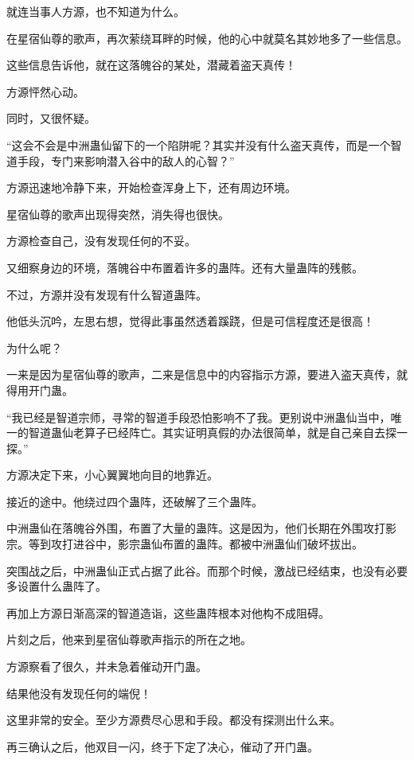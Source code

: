 
\begin{this_body}

就连当事人方源，也不知道为什么。

在星宿仙尊的歌声，再次萦绕耳畔的时候，他的心中就莫名其妙地多了一些信息。

这些信息告诉他，就在这落魄谷的某处，潜藏着盗天真传！

方源怦然心动。

同时，又很怀疑。

“这会不会是中洲蛊仙留下的一个陷阱呢？其实并没有什么盗天真传，而是一个智道手段，专门来影响潜入谷中的敌人的心智？”

方源迅速地冷静下来，开始检查浑身上下，还有周边环境。

星宿仙尊的歌声出现得突然，消失得也很快。

方源检查自己，没有发现任何的不妥。

又细察身边的环境，落魄谷中布置着许多的蛊阵。还有大量蛊阵的残骸。

不过，方源并没有发现有什么智道蛊阵。

他低头沉吟，左思右想，觉得此事虽然透着蹊跷，但是可信程度还是很高！

为什么呢？

一来是因为星宿仙尊的歌声，二来是信息中的内容指示方源，要进入盗天真传，就得用开门蛊。

“我已经是智道宗师，寻常的智道手段恐怕影响不了我。更别说中洲蛊仙当中，唯一的智道蛊仙老算子已经阵亡。其实证明真假的办法很简单，就是自己亲自去探一探。”

方源决定下来，小心翼翼地向目的地靠近。

接近的途中。他绕过四个蛊阵，还破解了三个蛊阵。

中洲蛊仙在落魄谷外围，布置了大量的蛊阵。这是因为，他们长期在外围攻打影宗。等到攻打进谷中，影宗蛊仙布置的蛊阵。都被中洲蛊仙们破坏拔出。

突围战之后，中洲蛊仙正式占据了此谷。而那个时候，激战已经结束，也没有必要多设置什么蛊阵了。

再加上方源日渐高深的智道造诣，这些蛊阵根本对他构不成阻碍。

片刻之后，他来到星宿仙尊歌声指示的所在之地。

方源察看了很久，并未急着催动开门蛊。

结果他没有发现任何的端倪！

这里非常的安全。至少方源费尽心思和手段。都没有探测出什么来。

再三确认之后，他双目一闪，终于下定了决心，催动了开门蛊。


\end{this_body}
